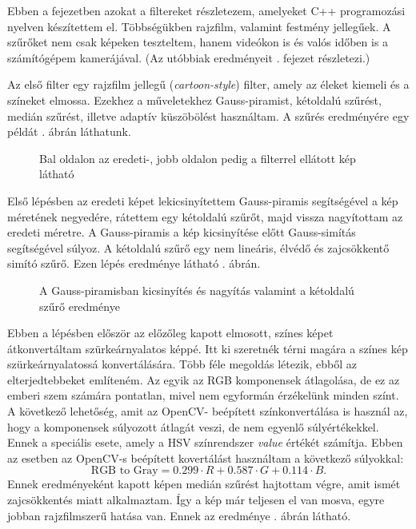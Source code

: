 

Ebben a fejezetben azokat a filtereket részletezem, amelyeket C++ programozási nyelven készítettem el. Többségükben rajzfilm, valamint festmény jellegűek. A szűrőket nem csak képeken teszteltem, hanem videókon is és valós időben is a számítógépem kamerájával. (Az utóbbiak eredményeit . fejezet részletezi.)


Az első filter egy rajzfilm jellegű (\textit{cartoon-style}) filter, amely az éleket kiemeli és a színeket elmossa. Ezekhez a műveletekhez Gauss-piramist, kétoldalú szűrést, medián szűrést, illetve adaptív küszöbölést használtam. A szűrés eredményére egy példát . ábrán láthatunk.

\begin{figure}[ht]
\centering
{}
\caption{Bal oldalon az eredeti-, jobb oldalon pedig a filterrel ellátott kép látható} 
\label{fig:cartoon1}
\end{figure}


Első lépésben az eredeti képet lekicsinyítettem Gauss-piramis segítségével a kép méretének negyedére, rátettem egy kétoldalú szűrőt, majd vissza nagyítottam az eredeti méretre. A Gauss-piramis a kép kicsinyítése előtt Gauss-simítás segítségével súlyoz. A kétoldalú szűrő egy nem lineáris, élvédő és zajcsökkentő simító szűrő. Ezen lépés eredménye látható . ábrán.

\begin{figure}[ht]
\centering
{}
\caption{A Gauss-piramisban kicsinyítés és nagyítás valamint a kétoldalú szűrő eredménye } 
\label{fig:cartoon2}
\end{figure}


Ebben a lépésben először az előzőleg kapott elmosott, színes képet átkonvertáltam szürkeárnyalatos képpé. 
Itt ki szeretnék térni magára a színes kép szürkeárnyalatossá konvertálására. Több féle megoldás létezik, ebből az elterjedtebbeket említeném. Az egyik az RGB komponensek átlagolása, de ez az emberi szem számára pontatlan, mivel nem egyformán érzékelünk minden színt. A következő lehetőség, amit az OpenCV- beépített színkonvertálása is használ az, hogy a komponensek súlyozott átlagát veszi, de nem egyenlő súlyértékekkel. Ennek a speciális esete, amely a HSV színrendszer \textit{value} értékét számítja. Ebben az esetben az OpenCV-s beépített kovertálást használtam a következő súlyokkal:
$$
\text{RGB to Gray} = 0.299 \cdot R+0.587 \cdot G + 0.114 \cdot B.
$$ 
Ennek eredményeként kapott képen medián szűrést hajtottam végre, amit ismét zajcsökkentés miatt alkalmaztam. Így a kép már teljesen el van mosva, egyre jobban rajzfilmszerű hatása van. Ennek az eredménye . ábrán látható.

